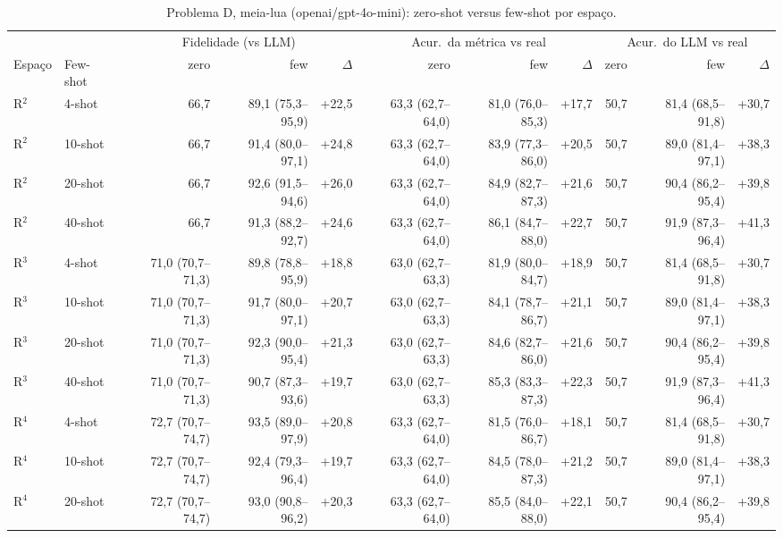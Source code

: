 \begin{table}[htbp]
\centering
\footnotesize
\caption{Problema D, meia-lua (openai/gpt-4o-mini): zero-shot versus few-shot por espaço.}
\label{tab:bloco1_D_zero_vs_fewshot_comparacao_gpt4mini}
\begin{tabular}{llrrrrrrrrr}
\toprule
 &  & \multicolumn{3}{c}{Fidelidade (vs LLM)} & \multicolumn{3}{c}{Acur.\ da métrica vs real} & \multicolumn{3}{c}{Acur.\ do LLM vs real} \\ \cmidrule(lr){3-5} \cmidrule(lr){6-8} \cmidrule(lr){9-11}
Espaço & Few-shot & zero & few & $\Delta$ & zero & few & $\Delta$ & zero & few & $\Delta$ \\
\midrule
R$^2$ & 4-shot & 66,7 & 89,1 (75,3–95,9) & +22,5 & 63,3 (62,7–64,0) & 81,0 (76,0–85,3) & +17,7 & 50,7 & 81,4 (68,5–91,8) & +30,7 \\
R$^2$ & 10-shot & 66,7 & 91,4 (80,0–97,1) & +24,8 & 63,3 (62,7–64,0) & 83,9 (77,3–86,0) & +20,5 & 50,7 & 89,0 (81,4–97,1) & +38,3 \\
R$^2$ & 20-shot & 66,7 & 92,6 (91,5–94,6) & +26,0 & 63,3 (62,7–64,0) & 84,9 (82,7–87,3) & +21,6 & 50,7 & 90,4 (86,2–95,4) & +39,8 \\
R$^2$ & 40-shot & 66,7 & 91,3 (88,2–92,7) & +24,6 & 63,3 (62,7–64,0) & 86,1 (84,7–88,0) & +22,7 & 50,7 & 91,9 (87,3–96,4) & +41,3 \\
\midrule
R$^3$ & 4-shot & 71,0 (70,7–71,3) & 89,8 (78,8–95,9) & +18,8 & 63,0 (62,7–63,3) & 81,9 (80,0–84,7) & +18,9 & 50,7 & 81,4 (68,5–91,8) & +30,7 \\
R$^3$ & 10-shot & 71,0 (70,7–71,3) & 91,7 (80,0–97,1) & +20,7 & 63,0 (62,7–63,3) & 84,1 (78,7–86,7) & +21,1 & 50,7 & 89,0 (81,4–97,1) & +38,3 \\
R$^3$ & 20-shot & 71,0 (70,7–71,3) & 92,3 (90,0–95,4) & +21,3 & 63,0 (62,7–63,3) & 84,6 (82,7–86,0) & +21,6 & 50,7 & 90,4 (86,2–95,4) & +39,8 \\
R$^3$ & 40-shot & 71,0 (70,7–71,3) & 90,7 (87,3–93,6) & +19,7 & 63,0 (62,7–63,3) & 85,3 (83,3–87,3) & +22,3 & 50,7 & 91,9 (87,3–96,4) & +41,3 \\
\midrule
R$^4$ & 4-shot & 72,7 (70,7–74,7) & 93,5 (89,0–97,9) & +20,8 & 63,3 (62,7–64,0) & 81,5 (76,0–86,7) & +18,1 & 50,7 & 81,4 (68,5–91,8) & +30,7 \\
R$^4$ & 10-shot & 72,7 (70,7–74,7) & 92,4 (79,3–96,4) & +19,7 & 63,3 (62,7–64,0) & 84,5 (78,0–87,3) & +21,2 & 50,7 & 89,0 (81,4–97,1) & +38,3 \\
R$^4$ & 20-shot & 72,7 (70,7–74,7) & 93,0 (90,8–96,2) & +20,3 & 63,3 (62,7–64,0) & 85,5 (84,0–88,0) & +22,1 & 50,7 & 90,4 (86,2–95,4) & +39,8 \\

\end{tabular}
\end{table}
